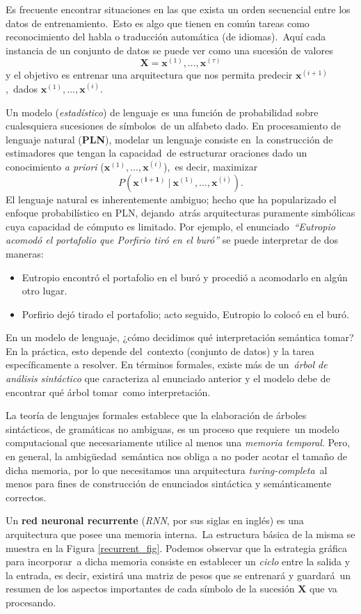 \noindent
Es frecuente encontrar situaciones en las que exista un orden secuencial entre los datos de entrenamiento.\
Esto es algo que tienen en común tareas como reconocimiento del habla o traducción automática (de idiomas).\
Aquí cada instancia de un conjunto de datos se puede ver como una sucesión de valores
\[\mathbf{X} = \mathbf{x}^{(1)},\ldots,\mathbf{x}^{(\tau)}\]
y el objetivo es entrenar una arquitectura que nos permita predecir $\mathbf{x}^{(i+1)}$,\
dados $\mathbf{x}^{(1)},\ldots,\mathbf{x}^{(i)}$.\par
Un modelo (\emph{estadístico}) de lenguaje es una función de probabilidad sobre cualesquiera sucesiones de símbolos\
de un alfabeto dado. En procesamiento de lenguaje natural (\textbf{PLN}), modelar un lenguaje consiste en\
la construcción de estimadores que tengan la capacidad\
de estructurar oraciones dado un conocimiento \emph{a priori} ($\mathbf{x}^{(1)},\ldots,\mathbf{x}^{(i)}$),\
es decir, maximizar
\begin{equation}
  P(\mathbf{x^{(i+1)}}\ |\ \mathbf{x}^{(1)},\ldots,\mathbf{x}^{(i)}).
\end{equation}
El lenguaje natural es inherentemente ambiguo; hecho que ha popularizado el enfoque probabilístico en PLN, dejando\
atrás arquitecturas puramente simbólicas cuya capacidad de cómputo es limitado. Por ejemplo, el enunciado\
\emph{``Eutropio acomodó el portafolio que Porfirio tiró en el buró''} se puede interpretar de dos maneras:
\begin{itemize}
\item Eutropio encontró el portafolio en el buró y procedió a acomodarlo en algún otro lugar.
\item Porfirio dejó tirado el portafolio; acto seguido, Eutropio lo colocó en el buró.
\end{itemize}\par
En un modelo de lenguaje, ¿cómo decidimos qué interpretación semántica tomar? En la práctica, esto depende del\
contexto (conjunto de datos) y la tarea específicamente a resolver. En términos formales, existe más de un\
\emph{árbol de análisis sintáctico} que caracteriza al enunciado anterior y el modelo debe de encontrar qué árbol tomar\
como interpretación.\par
La teoría de lenguajes formales establece que la elaboración de árboles sintácticos, de gramáticas no ambiguas, es un proceso que requiere\
un modelo computacional que necesariamente utilice al menos una \emph{memoria temporal}. Pero, en general, la ambigüedad\
semántica nos obliga a no poder acotar el tamaño de dicha memoria, por lo que necesitamos una arquitectura \emph{turing-completa}\
al menos para fines de construcción de enunciados sintáctica y semánticamente correctos.\par
Un \textbf{red neuronal recurrente} (\emph{RNN}, por sus siglas en inglés) es una arquitectura que posee una memoria interna.\
La estructura básica de la misma se muestra en la Figura \ref{recurrent_fig}. Podemos observar que la estrategia gráfica para incorporar\
a dicha memoria consiste en establecer un \emph{ciclo} entre la salida y la entrada, es decir, existirá una matriz de pesos que se entrenará y guardará\
un resumen de los aspectos importantes de cada símbolo de la sucesión $\mathbf{X}$ que va procesando.


